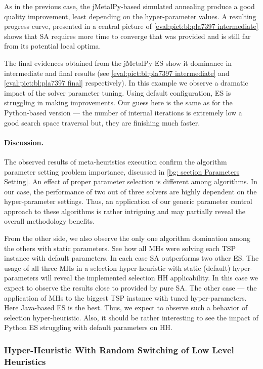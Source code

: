 As in the previous case, the jMetalPy-based simulated annealing produce a good quality improvement, least depending on the hyper-parameter values. A resulting progress curve, presented in a central picture of \cref{eval:pict:bl:pla7397 intermediate} shows that SA requires more time to converge that was provided and is still far from its potential local optima.

The final evidences obtained from the jMetalPy ES show it dominance in intermediate and final results (see \cref{eval:pict:bl:pla7397 intermediate} and \cref{eval:pict:bl:pla7397 final} respectively). In this example we observe a dramatic impact of the solver parameter tuning. Using default configuration, ES is struggling in making improvements. Our guess here is the same as for the Python-based version — the number of internal iterations is extremely low a good search space traversal but, they are finishing much faster.


\paragraph{Discussion.} The observed results of meta-heuristics execution confirm the algorithm parameter setting problem importance, discussed in \cref{bg: section Parameters Setting}. An effect of proper parameter selection is different among algorithms. In our case, the performance of two out of three solvers are highly dependent on the hyper-parameter settings. Thus, an application of our generic parameter control approach to these algorithms is rather intriguing and may partially reveal the overall methodology benefits.

From the other side, we also observe the only one algorithm domination among the others with static parameters. See how all MHs were solving each TSP instance with default parameters. In each case SA outperforms two other ES. The usage of all three MHs in a selection hyper-heuristic with static (default) hyper-parameters will reveal the implemented selection HH applicability. In this case we expect to observe the results close to provided by pure SA. The other case — the application of MHs to the biggest TSP instance with tuned hyper-parameters. Here Java-based ES is the best. Thus, we expect to observe such a behavior of selection hyper-heuristic. Also, it should be rather interesting to see the impact of Python ES struggling with default parameters on HH.


\subsubsection{Hyper-Heuristic With Random Switching of Low Level Heuristics}

